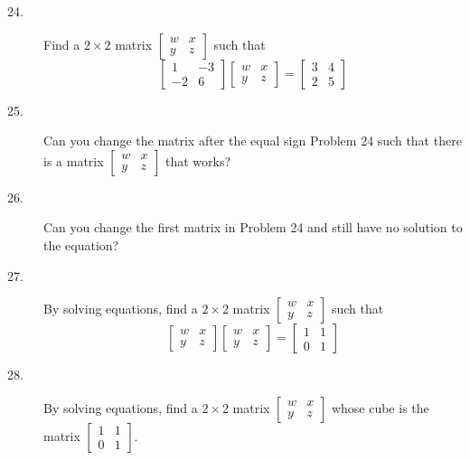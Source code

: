 \documentclass{article}
\begin{document}
\begin{description}
  \item[24.] Find a $2 \times 2$ matrix $\begin{bmatrix} w & x \\ y & z \end{bmatrix}$ such that
    \begin{equation*}
    \begin{bmatrix} 1 & -3 \\ -2 & 6 \end{bmatrix} \begin{bmatrix} w & x \\ y & z \end{bmatrix}
    = \begin{bmatrix} 3 & 4 \\ 2 & 5 \end{bmatrix}
    \end{equation*}

  \item[25.] Can you change the matrix after the equal sign Problem 24 such that there is a matrix $\begin{bmatrix} w & x \\ y & z \end{bmatrix}$ that works?

  \item[26.] Can you change the first matrix in Problem 24 and still have no solution to the equation? 

  \item[27.] By solving equations, find a $2 \times 2$ matrix $\begin{bmatrix} w & x \\ y & z \end{bmatrix}$ such that 
    \begin{equation*}
    \begin{bmatrix} w & x \\ y & z \end{bmatrix}  \begin{bmatrix} w & x \\ y & z \end{bmatrix}  =  \begin{bmatrix} 1 & 1 \\ 0 & 1 \end{bmatrix}
    \end{equation*}

  \item[28.] By solving equations, find a $2 \times 2$ matrix $\begin{bmatrix} w & x \\ y & z \end{bmatrix}$ whose cube is the matrix $\begin{bmatrix} 1 & 1 \\ 0 & 1 \end{bmatrix}$. 

\end{description}
\end{document}
